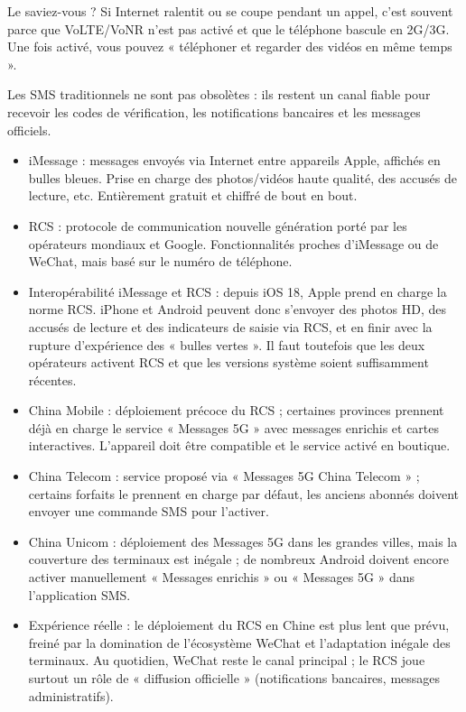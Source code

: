 \begin{tcbinfo}{Le saviez-vous ?}
Si Internet ralentit ou se coupe pendant un appel, c'est souvent parce que VoLTE/VoNR n'est pas activé et que le téléphone bascule en 2G/3G. Une fois activé, vous pouvez « téléphoner et regarder des vidéos en même temps ».

\end{tcbinfo}


Les SMS traditionnels ne sont pas obsolètes : ils restent un canal fiable pour recevoir les codes de vérification, les notifications bancaires et les messages officiels.

\begin{itemize}
  \item iMessage : messages envoyés via Internet entre appareils Apple, affichés en bulles bleues. Prise en charge des photos/vidéos haute qualité, des accusés de lecture, etc. Entièrement gratuit et chiffré de bout en bout.
  \item RCS : protocole de communication nouvelle génération porté par les opérateurs mondiaux et Google. Fonctionnalités proches d'iMessage ou de WeChat, mais basé sur le numéro de téléphone.
  \item Interopérabilité iMessage et RCS : depuis iOS 18, Apple prend en charge la norme RCS. iPhone et Android peuvent donc s'envoyer des photos HD, des accusés de lecture et des indicateurs de saisie via RCS, et en finir avec la rupture d'expérience des « bulles vertes ». Il faut toutefois que les deux opérateurs activent RCS et que les versions système soient suffisamment récentes.
\end{itemize}


\begin{itemize}
  \item China Mobile : déploiement précoce du RCS ; certaines provinces prennent déjà en charge le service « Messages 5G » avec messages enrichis et cartes interactives. L'appareil doit être compatible et le service activé en boutique.
  \item China Telecom : service proposé via « Messages 5G China Telecom » ; certains forfaits le prennent en charge par défaut, les anciens abonnés doivent envoyer une commande SMS pour l'activer.
  \item China Unicom : déploiement des Messages 5G dans les grandes villes, mais la couverture des terminaux est inégale ; de nombreux Android doivent encore activer manuellement « Messages enrichis » ou « Messages 5G » dans l'application SMS.
  \item Expérience réelle : le déploiement du RCS en Chine est plus lent que prévu, freiné par la domination de l'écosystème WeChat et l'adaptation inégale des terminaux. Au quotidien, WeChat reste le canal principal ; le RCS joue surtout un rôle de « diffusion officielle » (notifications bancaires, messages administratifs).
\end{itemize}

